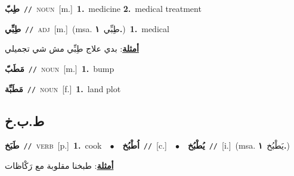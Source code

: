 \documentclass[10pt,a4paper,twoside]{article} %
\begin{document}
\begin{multicols}{2}
{\setlength\topsep{0pt}\textbf{\foreignlanguage{arabic}{طِبّ}}\ {\color{gray}\texttt{//}\color{black}}\ \textsc{noun}\ [m.]\ \textbf{1.}~medicine  \textbf{2.}~medical treatment\ } \vspace{2mm}

{\setlength\topsep{0pt}\textbf{\foreignlanguage{arabic}{طِبِّي}}\ {\color{gray}\texttt{//}\color{black}}\ \textsc{adj}\ [m.]\ \color{gray}(msa. \foreignlanguage{arabic}{طِبِّي}~\foreignlanguage{arabic}{\textbf{١.}})\color{black}\ \textbf{1.}~medical\  \begin{flushright}\color{gray}\foreignlanguage{arabic}{\textbf{\underline{\foreignlanguage{arabic}{أمثلة}}}: بدي علاج طِبِّي مش شي تجميلي}\end{flushright}\color{black}} \vspace{2mm}

{\setlength\topsep{0pt}\textbf{\foreignlanguage{arabic}{مَطَبّ}}\ {\color{gray}\texttt{//}\color{black}}\ \textsc{noun}\ [m.]\ \textbf{1.}~bump\ } \vspace{2mm}

{\setlength\topsep{0pt}\textbf{\foreignlanguage{arabic}{مَطَبِّة}}\ {\color{gray}\texttt{//}\color{black}}\ \textsc{noun}\ [f.]\ \textbf{1.}~land plot\ } \vspace{2mm}

\vspace{-3mm}
\subsection*{\color{blue}\foreignlanguage{arabic}{ط.ب.خ}\color{blue}{}} 

{\setlength\topsep{0pt}\textbf{\foreignlanguage{arabic}{طَبَخ}}\ {\color{gray}\texttt{//}\color{black}}\ \textsc{verb}\ [p.]\ \textbf{1.}~cook\ \ $\bullet$\ \ \setlength\topsep{0pt}\textbf{\foreignlanguage{arabic}{اُطْبُخ}}\ {\color{gray}\texttt{//}\color{black}}\ [c.]\ \ $\bullet$\ \ \setlength\topsep{0pt}\textbf{\foreignlanguage{arabic}{يُطْبُخ}}\ {\color{gray}\texttt{//}\color{black}}\ [i.]\ \color{gray}(msa. \foreignlanguage{arabic}{يَطْبُخ}~\foreignlanguage{arabic}{\textbf{١.}})\color{black}\  \begin{flushright}\color{gray}\foreignlanguage{arabic}{\textbf{\underline{\foreignlanguage{arabic}{أمثلة}}}: طبخنا مقلوبة مع رَكْاظات}\end{flushright}\color{black}} \vspace{2mm}


\end{multicols}
\end{document}
